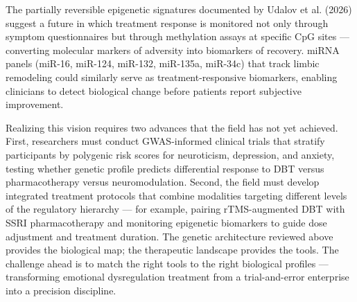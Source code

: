 The partially reversible epigenetic signatures documented by Udalov et al.
(2026) suggest a future in which treatment response is monitored not only
through symptom questionnaires but through methylation assays at specific CpG
sites — converting molecular markers of adversity into biomarkers of
recovery.\cite{udalov2026}
miRNA panels (miR-16, miR-124, miR-132, miR-135a, miR-34c) that track limbic
remodeling could similarly serve as treatment-responsive biomarkers, enabling
clinicians to detect biological change before patients report subjective
improvement.\cite{udalov2026}

Realizing this vision requires two advances that the field has not yet achieved.
First, researchers must conduct GWAS-informed clinical trials that stratify
participants by polygenic risk scores for neuroticism, depression, and anxiety,
testing whether genetic profile predicts differential response to DBT versus
pharmacotherapy versus neuromodulation.
Second, the field must develop integrated treatment protocols that combine
modalities targeting different levels of the regulatory hierarchy —
for example, pairing rTMS-augmented DBT with SSRI pharmacotherapy and
monitoring epigenetic biomarkers to guide dose adjustment and treatment
duration.
The genetic architecture reviewed above provides the biological map;
the therapeutic landscape provides the tools.
The challenge ahead is to match the right tools to the right biological
profiles — transforming emotional dysregulation treatment from a trial-and-error
enterprise into a precision discipline.\cite{nagel2018}
